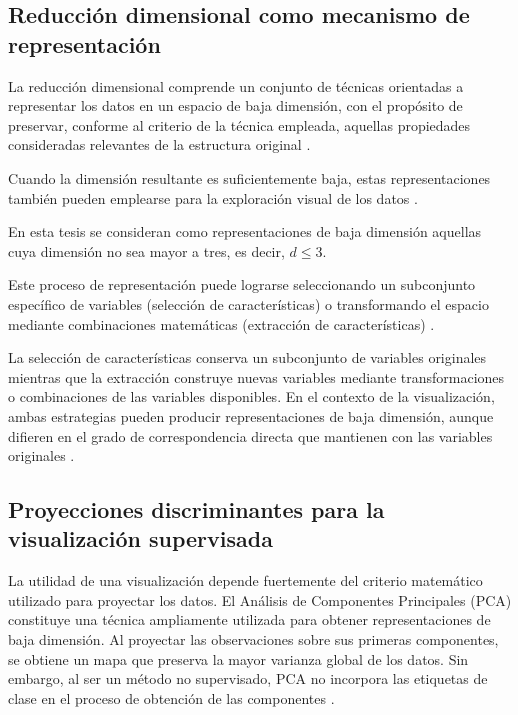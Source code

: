 \subsection{Reducción dimensional como mecanismo de representación}

La reducción dimensional comprende un conjunto de técnicas orientadas a representar los datos en un espacio de baja dimensión, con el propósito de preservar, conforme al criterio de la técnica empleada, aquellas propiedades consideradas relevantes de la estructura original \cite{zebari2020comprehensive}. 

Cuando la dimensión resultante es suficientemente baja, estas representaciones también pueden emplearse para la exploración visual de los datos \cite{hasan2021review}.

En esta tesis se consideran como representaciones de baja dimensión aquellas cuya dimensión no sea mayor a tres, es decir, $d\leq3$.


Este proceso de representación puede lograrse seleccionando un subconjunto específico de variables (selección de características) o transformando el espacio mediante combinaciones matemáticas (extracción de características) \cite{nogales2023analysis}. 

La selección de características conserva un subconjunto de variables originales mientras que la extracción construye nuevas variables mediante transformaciones o combinaciones de las variables disponibles. En el contexto de la visualización, ambas estrategias pueden producir representaciones de baja dimensión, aunque difieren en el grado de correspondencia directa que mantienen con las variables originales \cite{zebari2020comprehensive}.

\subsection{Proyecciones discriminantes para la visualización supervisada}

La utilidad de una visualización depende fuertemente del criterio matemático utilizado para proyectar los datos. El Análisis de Componentes Principales (PCA) constituye una técnica ampliamente utilizada para obtener representaciones de baja dimensión. Al proyectar las observaciones sobre sus primeras componentes, se obtiene un mapa que preserva la mayor varianza global de los datos. Sin embargo, al ser un método no supervisado, PCA no incorpora las etiquetas de clase en el proceso de obtención de las componentes \cite{bharadiya2023tutorial}.


